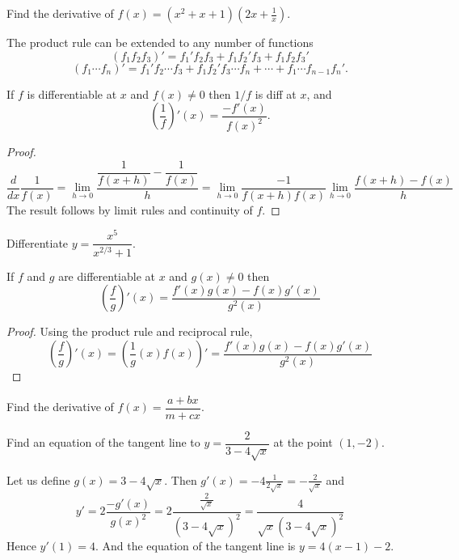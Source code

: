 \documentclass[../calc1-main.tex]{subfiles}
\begin{document}
  \begin{example}
    Find the derivative of $f(x) = (x^2+x+1)(2x + \frac{1}{x})$.
  \end{example}

  The product rule can be extended to any number of functions
  \[
    (f_1 f_2 f_3)' = f_1' f_2 f_3 + f_1 f_2' f_3  + f_1 f_2 f_3'
  \]
  \[
    (f_1 \cdots f_n)' = f_1' f_2 \cdots f_3 + f_1 f_2' f_3 \cdots f_n + \cdots + f_1 \cdots f_{n-1} f_n'.
  \]

  \begin{theorem}
    If $f$ is differentiable at $x$ and $f(x) \neq 0$ then $1/f$ is diff at $x$, and
    \[
      \left(\dfrac{1}{f} \right)'(x) = \dfrac{-f'(x)}{f(x)^2}.
    \]
  \end{theorem}
  \begin{proof}
    \[
      \dfrac{d}{dx} \dfrac{1}{f(x)} = \lim_{h \to 0} \frac{\dfrac{1}{f(x+h)}-\dfrac{1}{f(x)}}{h} = \lim_{h \to 0} \dfrac{-1}{f(x+h) f(x)} \lim_{h \to 0} \dfrac{f(x+h)-f(x)}{h}
    \]
    The result follows by limit rules and continuity of $f$.
  \end{proof}

  \begin{example}
    Differentiate $y = \dfrac{x^5}{x^{2/3} + 1}$.
  \end{example}

  \begin{theorem}
    If $f$ and $g$ are differentiable at $x$ and $g(x) \neq 0$ then
    \[
      \left( \dfrac{f}{g} \right)'(x) =
      \dfrac{f'(x) g(x) - f(x) g'(x)}{g^2(x)}
    \]
  \end{theorem}
  \begin{proof}
    Using the product rule and reciprocal rule,
    \[
      \left( \dfrac{f}{g} \right)'(x) = \left( \dfrac{1}{g}(x) f(x) \right)' = \dfrac{f'(x) g(x) - f(x) g'(x)}{g^2(x)}
    \]
  \end{proof}

  \begin{example}
    Find the derivative of $f(x) = \dfrac{a + b x}{m + c x}$.
  \end{example}

  \begin{example}
    Find an equation of the tangent line to $y = \dfrac{2}{3-4 \sqrt{x}}$ at the point $(1, -2)$.
  \end{example}
  \begin{solution}
    Let us define $g(x)=3-4\sqrt{x}$. Then $g'(x)=-4 \frac{1}{2\sqrt{x}}=-\frac{2}{\sqrt{x}}$ and
    \[
      y'=2 \frac{-g'(x)}{g(x)^2}
      =2 \frac{\frac{2}{\sqrt{x}}}{(3-4\sqrt{x})^2}
      =\frac{4}{\sqrt{x}(3-4\sqrt{x})^2}
    \]
    Hence $y'(1)=4$. And the equation of the tangent line is $y=4(x-1)-2$.
  \end{solution}
\end{document}
